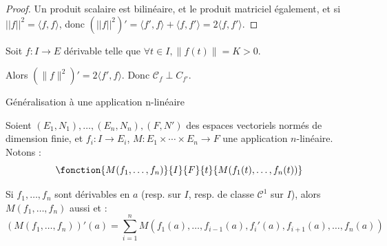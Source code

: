 
\begin{proof}
    Un produit scalaire est bilinéaire, et le produit matriciel également, et si 
    $||f||^2 = \langle f, f \rangle$, donc $(||f||^2)' = \langle f', f \rangle + \langle f, f' \rangle = 2 \langle f, f' \rangle$.
\end{proof}

\begin{exemple}
Soit $f: I \to E$ dérivable telle que $\forall t \in I, \|f(t)\| = K > 0$.

Alors $(\|f\|^2)' = 2 \langle f',f \rangle$. Donc $\mathscr C_f \perp C_{f'}$.
\end{exemple}

\begin{figure}[htbp]
\centering
{}
\end{figure}

\begin{theoreme}{Généralisation à une application n-linéaire}{}

    Soient $(E_1, N_1), \ldots, (E_n, N_n), (F, N')$ des espaces vectoriels normés de dimension finie, et
    $f_i : I \to E_i$, $M : E_1 \times \cdots \times E_n \to F$ une application $n$-linéaire.
    Notons :
    \[\fonction{M(f_1, \ldots, f_n)}{I}{F}{t}{M(f_1(t), \ldots, f_n(t))}\]

    \avspace Si $f_1, \ldots, f_n$ sont dérivables en $a$ (resp. sur $I$, resp. de classe $\mathscr C^1$ sur $I$),
    alors $M(f_1, \ldots, f_n)$ aussi et :
    \[(M(f_1, \ldots, f_n))'(a) = \sum_{i=1}^n M(f_1(a), \ldots, f_{i-1}(a), f_i'(a), f_{i+1}(a), \ldots, f_n(a))\]
\end{theoreme}

